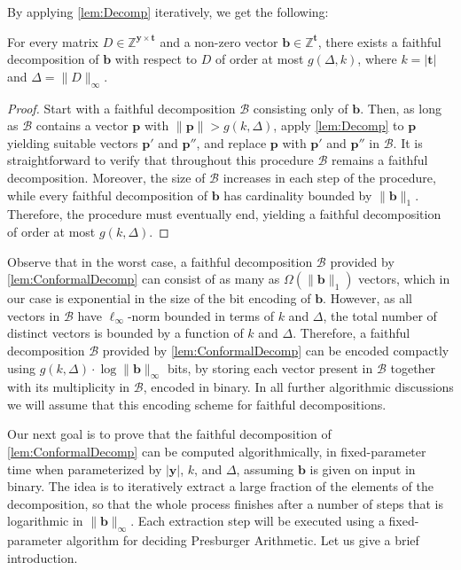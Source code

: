 \documentclass{theoretics}
\newcommand{\Bb}{\mathcal{B}}
\newcommand{\Z}{\mathbb{Z}}
\newcommand{\tup}[1]{{\mathbf{#1}}}
\newcommand{\yy}{\tup y}
\newcommand{\tv}{\tup t}
\newcommand{\bb}{\tup b}
\newcommand{\pp}{\tup p}
\newcommand{\matrices}[3]{#1^{#2\times #3}}
\begin{document}
By applying \cref{lem:Decomp} iteratively, we get the following:

\begin{lemma}\label{lem:ConformalDecomp}
For every matrix $D\in \matrices{\Z}{\yy}{\tv}$ and a non-zero vector $\bb\in \Z^{\tv}$, there exists a faithful decomposition of $\bb$ with respect to $D$ of order at most $g(\Delta,k)$, where $k=|\tv|$ and $\Delta=\|D\|_\infty$.
\end{lemma}
\begin{proof}
Start with a faithful decomposition $\Bb$ consisting only of $\bb$. Then, as long as $\Bb$ contains a vector $\pp$ with $\|\pp\|>g(k,\Delta)$, apply \cref{lem:Decomp} to $\pp$ yielding suitable vectors $\pp'$ and $\pp''$, and replace $\pp$ with $\pp'$ and $\pp''$ in $\Bb$. It is straightforward to verify that throughout this procedure $\Bb$ remains a faithful decomposition. Moreover, the size of $\Bb$ increases in each step of the procedure, while every faithful decomposition of $\bb$ has cardinality bounded by $\|\bb\|_1$. Therefore, the procedure must eventually end, yielding a faithful decomposition of order at most $g(k,\Delta)$.
\end{proof}

Observe that in the worst case, a faithful decomposition $\Bb$ provided by \cref{lem:ConformalDecomp} can consist of as many as $\Omega(\|\bb\|_1)$ vectors, which in our case is exponential in the size of the bit encoding of $\bb$. However, as all vectors in $\Bb$ have $\ell_\infty$-norm bounded in terms of $k$ and $\Delta$, the total number of distinct vectors is bounded by a function of $k$ and $\Delta$. Therefore, a faithful decomposition $\Bb$ provided by \cref{lem:ConformalDecomp} can be encoded compactly using $g(k,\Delta)\cdot \log \|\bb\|_\infty$ bits, by storing each vector present in $\Bb$ together with its multiplicity in $\Bb$, encoded in binary. In all further algorithmic discussions we will assume that this encoding scheme for faithful decompositions.

Our next goal is to prove that the faithful decomposition of \cref{lem:ConformalDecomp} can be computed algorithmically, in fixed-parameter time when parameterized by $|\yy|$, $k$, and $\Delta$, assuming $\bb$ is given on input in binary. The idea is to iteratively extract a large fraction of the elements of the decomposition, so that the whole process finishes after a number of steps that is logarithmic in $\|\bb\|_\infty$. Each extraction step will be executed using a fixed-parameter algorithm for deciding Presburger Arithmetic. Let us give a brief introduction.
\end{document}
